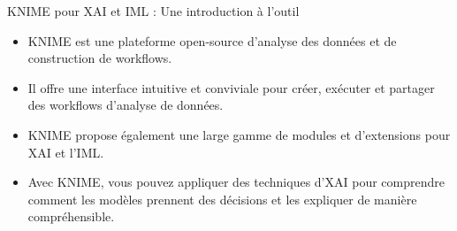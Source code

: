 \documentclass{beamer}
\begin{document}
\begin{frame}{KNIME pour XAI et IML : Une introduction à l'outil}
	\begin{itemize}
		\item KNIME est une plateforme open-source d'analyse des données et de construction de workflows.
		\item Il offre une interface intuitive et conviviale pour créer, exécuter et partager des workflows d'analyse de données.
		\item KNIME propose également une large gamme de modules et d'extensions pour XAI et l'IML.
		\item Avec KNIME, vous pouvez appliquer des techniques d'XAI pour comprendre comment les modèles prennent des décisions et les expliquer de manière compréhensible.
	\end{itemize}
\end{frame}
\end{document}
